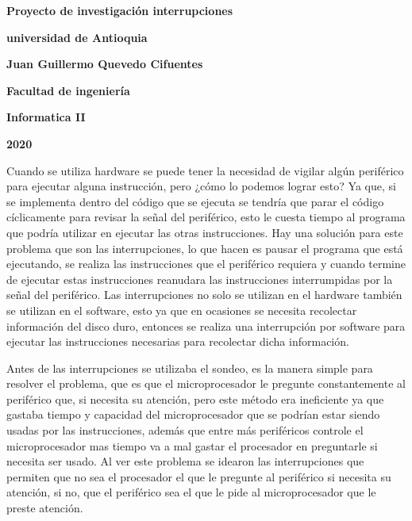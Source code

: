 \documentclass[12pt]{article}
\begin{document}
\begin{center}
\bf{\sc\Huge Proyecto de investigación interrupciones}\\
\end{center}
\vspace{60pt}
\begin{center}
\bf{\sc\Huge universidad de Antioquia}\\
\end{center}
\vspace{120pt}
\begin{center}
\bf{\sc\Huge Juan Guillermo Quevedo Cifuentes }\\
\end{center}
\vspace{120pt}
\begin{center}
\bf{\sc\Huge Facultad de ingeniería}
\end{center}
\vspace{5pt}
\begin{center}
\bf{\sc\Huge Informatica II}
\end{center}
\vspace{5pt}
\begin{center}
\bf{\sc\Huge 2020}\\
\end{center}
\newpage

Cuando se utiliza hardware se puede tener la necesidad de vigilar algún periférico para ejecutar alguna instrucción, pero ¿cómo lo podemos lograr esto? Ya que, si se implementa dentro del código que se ejecuta se tendría que parar el código cíclicamente para revisar la señal del periférico, esto le cuesta tiempo al programa que podría utilizar en ejecutar las otras instrucciones. Hay una solución para este problema que son las interrupciones, lo que hacen es pausar el programa que está ejecutando, se realiza las instrucciones que el periférico requiera y cuando termine de ejecutar estas instrucciones reanudara las instrucciones interrumpidas por la señal del periférico. Las interrupciones no solo se utilizan en el hardware también se utilizan en el software, esto ya que en ocasiones se necesita recolectar información del disco duro, entonces se realiza una interrupción por software para ejecutar las instrucciones necesarias para recolectar dicha información.\cite{Sistemasintegrados}

\vspace{10}

Antes de las interrupciones se utilizaba el sondeo, es la manera simple para resolver el problema, que es que el microprocesador le pregunte constantemente al periférico que, si necesita su atención, pero este método era ineficiente ya que gastaba tiempo y capacidad del microprocesador que se podrían estar siendo usadas por las instrucciones, además que entre más periféricos controle el microprocesador mas tiempo va a mal gastar el procesador en preguntarle si necesita ser usado. Al ver este problema se idearon las interrupciones que permiten que no sea el procesador el que le pregunte al periférico si necesita su atención, si no, que el periférico sea el que le pide al microprocesador que le preste atención.\cite{interruptsmadeeasy}
\end{document}
